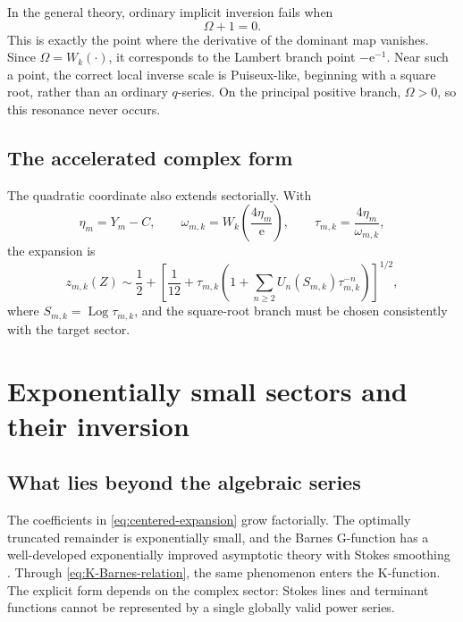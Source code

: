 \documentclass[11pt,a4paper]{article}
\numberwithin{equation}{section}
\theoremstyle{remark}
\DeclareMathOperator{\Log}{Log}
\newcommand{\e}{\mathrm e}
\begin{document}
In the general theory, ordinary implicit inversion fails when
\begin{equation}
\Omega+1=0.
\label{eq:resonance}
\end{equation}
This is exactly the point where the derivative of the dominant map vanishes.
Since \(\Omega=W_k(\cdot)\), it corresponds to the Lambert branch point
\(-\e^{-1}\).  Near such a point, the correct local inverse scale is
Puiseux-like, beginning with a square root, rather than an ordinary
\(q\)-series.  On the principal positive branch, \(\Omega>0\), so this
resonance never occurs.

\subsection{The accelerated complex form}

The quadratic coordinate also extends sectorially.  With
\begin{equation}
\eta_m=Y_m-C,
\qquad
\omega_{m,k}=W_k\!\left(\frac{4\eta_m}{\e}\right),
\qquad
\tau_{m,k}=\frac{4\eta_m}{\omega_{m,k}},
\label{eq:complex-tau}
\end{equation}
the expansion is
\begin{equation}
z_{m,k}(Z)\sim
\frac12+
\left[
\frac1{12}+\tau_{m,k}
\left(1+\sum_{n\ge2}U_n(S_{m,k})\tau_{m,k}^{-n}\right)
\right]^{1/2},
\label{eq:complex-accelerated}
\end{equation}
where \(S_{m,k}=\Log\tau_{m,k}\), and the square-root branch must be chosen
consistently with the target sector.

\section{Exponentially small sectors and their inversion}
\label{sec:exponential-sectors}

\subsection{What lies beyond the algebraic series}

The coefficients in \cref{eq:centered-expansion} grow factorially.  The
optimally truncated remainder is exponentially small, and the Barnes
G-function has a well-developed exponentially improved asymptotic theory
with Stokes smoothing \cite{Nemes2014}.  Through
\cref{eq:K-Barnes-relation}, the same phenomenon enters the K-function.
The explicit form depends on the complex sector: Stokes lines and terminant
functions cannot be represented by a single globally valid power series.
\end{document}
